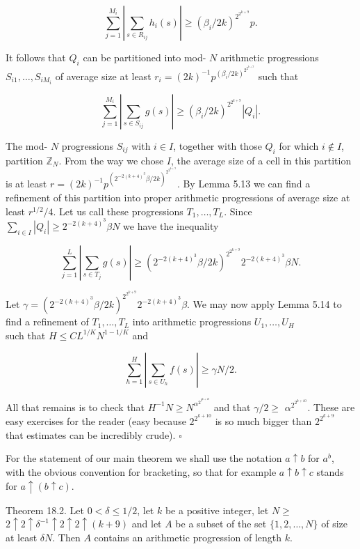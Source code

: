 \documentclass[10pt]{article}
\begin{document}
$$
\sum_{j=1}^{M_{i}}\left|\sum_{s \in R_{i j}} h_{i}(s)\right| \geqslant\left(\beta_{i} / 2 k\right)^{2^{2^{k+9}}} p .
$$

It follows that $Q_{i}$ can be partitioned into mod- $N$ arithmetic progressions $S_{i 1}, \ldots, S_{i M_{i}}$ of average size at least $r_{i}=(2 k)^{-1} p^{\left(\beta_{i} / 2 k\right)^{2^{2^{k+9}}}}$ such that

$$
\sum_{j=1}^{M_{i}}\left|\sum_{s \in S_{i j}} g(s)\right| \geqslant\left(\beta_{i} / 2 k\right)^{2^{2^{k+9}}}\left|Q_{i}\right| .
$$

The mod- $N$ progressions $S_{i j}$ with $i \in I$, together with those $Q_{i}$ for which $i \notin I$, partition $\mathbb{Z}_{N}$. From the way we chose $I$, the average size of a cell in this partition is at least $r=(2 k)^{-1} p^{\left(2^{-2(k+4)^{3}} \beta / 2 k\right)^{2^{2^{k+9}}}}$. By Lemma 5.13 we can find a refinement of this partition into proper arithmetic progressions of average size at least $r^{1 / 2} / 4$. Let us call these progressions $T_{1}, \ldots, T_{L}$. Since $\sum_{i \in I}\left|Q_{i}\right| \geqslant 2^{-2(k+4)^{3}} \beta N$ we have the inequality

$$
\sum_{j=1}^{L}\left|\sum_{s \in T_{j}} g(s)\right| \geqslant\left(2^{-2(k+4)^{3}} \beta / 2 k\right)^{2^{2^{k+9}}} 2^{-2(k+4)^{3}} \beta N .
$$

Let $\gamma=\left(2^{-2(k+4)^{3}} \beta / 2 k\right)^{2^{2^{k+9}}} 2^{-2(k+4)^{3}} \beta$. We may now apply Lemma 5.14 to find a refinement of $T_{1}, \ldots, T_{L}$ into arithmetic progressions $U_{1}, \ldots, U_{H}$\\
such that $H \leqslant C L^{1 / K} N^{1-1 / K}$ and

$$
\sum_{h=1}^{H}\left|\sum_{s \in U_{h}} f(s)\right| \geqslant \gamma N / 2 .
$$

All that remains is to check that $H^{-1} N \geqslant N^{\alpha^{2^{2^{k+10}}}}$ and that $\gamma / 2 \geqslant$ $\alpha^{2^{2^{k+10}}}$. These are easy exercises for the reader (easy because $2^{2^{k+10}}$ is so much bigger than $2^{2^{k+9}}$ that estimates can be incredibly crude). \(\square\)

For the statement of our main theorem we shall use the notation $a \uparrow b$ for $a^{b}$, with the obvious convention for bracketing, so that for example $a \uparrow b \uparrow c$ stands for $a \uparrow(b \uparrow c)$.

Theorem 18.2. Let $0<\delta \leqslant 1 / 2$, let $k$ be a positive integer, let $N \geqslant$ $2 \uparrow 2 \uparrow \delta^{-1} \uparrow 2 \uparrow 2 \uparrow(k+9)$ and let $A$ be a subset of the set $\{1,2, \ldots, N\}$ of size at least $\delta N$. Then $A$ contains an arithmetic progression of length $k$.
\end{document}
